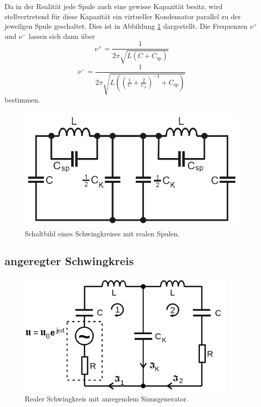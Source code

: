 Da in der Realität jede Spule auch eine gewisse Kapazität besitz, wird stellvertretend für diese Kapazität ein
virtueller Kondensator parallel zu der jeweilgen Spule geschaltet. Dies ist in Abbildung \ref{fig:bild7} dargestellt. 
Die Frequenzen $\nu^+$ und $\nu^-$ lassen sich dann über
\begin{equation}
    \nu^+=\frac{1}{2\pi\sqrt{L(C+C_{\text {sp}})}}
\end{equation}
\begin{equation}
    \nu^-=\frac{1}{2\pi\sqrt{L\left(\left(\frac{1}{C}+\frac{2}{C_k}\right)^{-1}+C_{\text {sp}}\right)}}
\end{equation}
bestimmen.

\begin{figure}

    \centering
    \includegraphics[height=6.0cm]{data/Bild7.png}
    \caption{Schaltbild eines Schwingkreises mit realen Spulen.}
    \label{fig:bild7}
\end{figure}

\subsection{angeregter Schwingkreis}

\begin{figure}

    \centering
    \includegraphics[height=6.0cm]{data/Bild4.png}
    \caption{Realer Schwingkreis mit anregendem Sinusgenerator.}
    \label{fig:bild4}
\end{figure}

